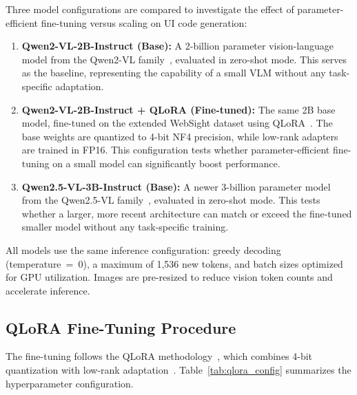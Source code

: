 Three model configurations are compared to investigate the effect of parameter-efficient fine-tuning versus scaling on UI code generation:

\begin{enumerate}
    \item \textbf{Qwen2-VL-2B-Instruct (Base):} A 2-billion parameter vision-language model from the Qwen2-VL family~\cite{wang2024qwen2vl}, evaluated in zero-shot mode. This serves as the baseline, representing the capability of a small VLM without any task-specific adaptation.
    
    \item \textbf{Qwen2-VL-2B-Instruct + QLoRA (Fine-tuned):} The same 2B base model, fine-tuned on the extended WebSight dataset using QLoRA~\cite{dettmers2023qlora}. The base weights are quantized to 4-bit NF4 precision, while low-rank adapters are trained in FP16. This configuration tests whether parameter-efficient fine-tuning on a small model can significantly boost performance.
    
    \item \textbf{Qwen2.5-VL-3B-Instruct (Base):} A newer 3-billion parameter model from the Qwen2.5-VL family~\cite{bai2025qwen25vl}, evaluated in zero-shot mode. This tests whether a larger, more recent architecture can match or exceed the fine-tuned smaller model without any task-specific training.
\end{enumerate}

All models use the same inference configuration: greedy decoding (temperature~=~0), a maximum of 1,536 new tokens, and batch sizes optimized for GPU utilization. Images are pre-resized to reduce vision token counts and accelerate inference.

\subsection{QLoRA Fine-Tuning Procedure}

The fine-tuning follows the QLoRA methodology~\cite{dettmers2023qlora}, which combines 4-bit quantization with low-rank adaptation~\cite{hu2021lora}. Table~\ref{tab:qlora_config} summarizes the hyperparameter configuration.

